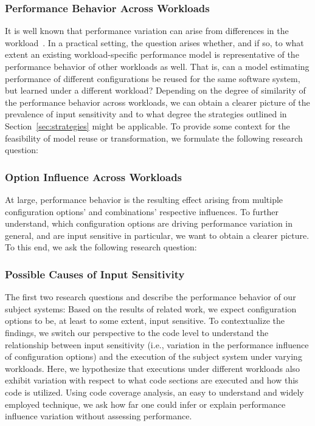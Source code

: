 \subsubsection{Performance Behavior Across Workloads}
It is well known that performance variation can arise from differences in the workload~\cite{benchmarking_book}. In a practical setting, the question arises whether, and if so, to what extent an existing workload-specific performance model is representative of the performance behavior of other workloads as well. 
That is, can a model estimating performance of different configurations be reused for the same software system, but learned under a different workload? Depending on the degree of similarity of the performance behavior across workloads, we can obtain a clearer picture of the prevalence of input sensitivity and to what degree the strategies outlined in  Section~\ref{sec:strategies} might be applicable.
To provide some context for the feasibility of model reuse or transformation, we formulate the following research question: 


\subsubsection{Option Influence Across Workloads}
At large, performance behavior is the resulting effect arising from multiple configuration options’ and combinations’ respective influences. To further understand, which configuration options are driving performance variation in general, and are input sensitive in particular, we want to obtain a clearer picture. To this end, we ask the following research question:


\subsubsection{Possible Causes of Input Sensitivity}
The first two research questions  and  describe the performance behavior of our subject systems: Based on the results of related work, we expect configuration options to be, at  least to some extent, input sensitive. To contextualize the findings, we switch our perspective to the code level to understand the relationship between input sensitivity (i.e., variation in the performance influence of configuration options) and the execution of the subject system under varying workloads. Here, we hypothesize that executions under different workloads also exhibit variation with respect to what code sections are executed and how this code is utilized. Using code coverage analysis, an easy to understand and widely employed technique, we ask how far one could infer or explain performance influence variation without assessing performance. 

